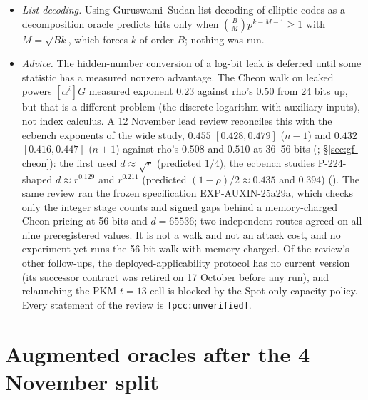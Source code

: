 \begin{itemize}
  polynomial, not the cost of an algorithm; they exclude a low-degree
  interpolant on a set of density $1-O(1/l)$ or on a product set, not on
  sparse or structured subsets. Whether they cover the statistics of
  Chapter~\ref{ch:learning} is open.
\item \emph{List decoding.} Using Guruswami--Sudan list decoding of elliptic
  codes as a decomposition oracle predicts hits only when
  $\binom BMp^{k-M-1}\ge1$ with $M=\sqrt{Bk}$, which forces $k$ of order $B$;
  nothing was run.
\item \emph{Advice.} The hidden-number conversion of a log-bit leak is
  deferred until some statistic has a measured nonzero advantage. The Cheon
  walk on leaked powers $[\alpha^i]G$ measured exponent $0.23$ against rho's
  $0.50$ from 24 bits up, but that is a different problem (the discrete
  logarithm with auxiliary inputs), not index calculus. A 12 November lead
  review reconciles this with the ecbench exponents of the wide study,
  $0.455$ $[0.428,0.479]$ ($n-1$) and $0.432$ $[0.416,0.447]$ ($n+1$) against
  rho's $0.508$ and $0.510$ at 36--56 bits
  (; \S\ref{sec:gf-cheon}): the first used $d\approx\sqrt r$ (predicted
  $1/4$), the ecbench studies P-224-shaped $d\approx r^{0.129}$ and $r^{0.211}$
  (predicted $(1-\rho)/2\approx0.435$ and $0.394$)
  (). The same review ran
  the frozen specification EXP-AUXIN-25a29a, which checks only the integer
  stage counts and signed gaps behind a memory-charged Cheon pricing at 56
  bits and $d=65536$; two independent routes agreed on all nine
  preregistered values. It is not a walk and not an attack cost, and no
  experiment yet runs the 56-bit walk with memory charged. Of the review's
  other follow-ups, the deployed-applicability protocol has no current
  version (its successor contract was retired on 17 October before any
  run), and relaunching the PKM $t=13$ cell is blocked by the Spot-only
  capacity policy. Every statement of the review is
  \texttt{[pcc:unverified]}.
\end{itemize}

\section{Augmented oracles after the 4 November split}\label{sec:um-oracles}

